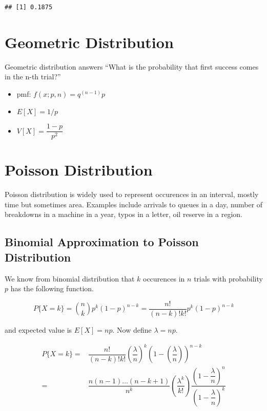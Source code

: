 \documentclass[]{book}
\theoremstyle{definition}
\theoremstyle{definition}
\theoremstyle{definition}
\theoremstyle{remark}
\begin{document}
\begin{verbatim}
## [1] 0.1875
\end{verbatim}

\hypertarget{geometric-distribution}{%
\section{Geometric Distribution}\label{geometric-distribution}}

Geometric distribution answers ``What is the probability that first
success comes in the n-th trial?''

\begin{itemize}
\item
  pmf: \(f(x;p,n) = q^{(n-1)}p\)
\item
  \(E[X] = 1/p\)
\item
  \(V[X] = \dfrac{1-p}{p^2}\)
\end{itemize}

\hypertarget{poisson-distribution}{%
\section{Poisson Distribution}\label{poisson-distribution}}

Poisson distribution is widely used to represent occurences in an
interval, mostly time but sometimes area. Examples include arrivals to
queues in a day, number of breakdowns in a machine in a year, typos in a
letter, oil reserve in a region.

\hypertarget{binomial-approximation-to-poisson-distribution}{%
\subsection{Binomial Approximation to Poisson
Distribution}\label{binomial-approximation-to-poisson-distribution}}

We know from binomial distribution that \(k\) occurences in \(n\) trials
with probability \(p\) has the following function.

\[P\{X = k\} = \binom{n}{k} p^k (1-p)^{n-k} = \dfrac{n!}{(n-k)!k!} p^k (1-p)^{n-k}\]

and expected value is \(E[X] = np\). Now define \(\lambda = np\).

\begin{align*}
P\{X = k\} =& \dfrac{n!}{(n-k)!k!} \left(\dfrac{\lambda}{n}\right)^k \left(1-\left(\dfrac{\lambda}{n}\right)\right)^{n-k} \\
           =& \dfrac{n (n-1) \dots (n-k+1)}{n^k} \left(\dfrac{\lambda^k}{k!}\right) \dfrac{(1-\dfrac{\lambda}{n})^n}{(1-\dfrac{\lambda}{n})^k}
\end{align*}
\end{document}
